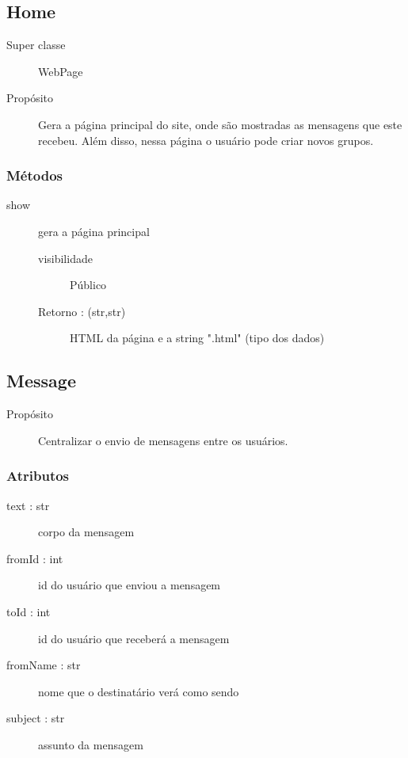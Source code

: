 \documentclass[a4paper]{article}
\begin{document}
	\subsection{Home}
	
	\begin{description}
		\item [Super classe] WebPage
		\item [Propósito] Gera a página principal do site, onde são mostradas as mensagens que este recebeu. Além disso, nessa página o usuário pode criar novos grupos.
	\end{description}
	
	\subsubsection{Métodos}
		\begin{description} %
		 \item [show] gera a página principal
			\begin{description} %
				\item [visibilidade] Público			 
				\item [Retorno : (str,str)] HTML da página e a string ".html" (tipo dos dados)
			\end{description} %
		\end{description} %
	
	\subsection{Message}
	
	\begin{description}
		\item [Propósito] Centralizar o envio de mensagens entre os usuários.
	\end{description}	
	
	\subsubsection{Atributos}
		\begin{description}
		 \item [text : str] corpo da mensagem
		 \item [fromId : int] id do usuário que enviou a mensagem
		 \item [toId : int] id do usuário que receberá a mensagem
		 \item [fromName : str] nome que o destinatário verá como sendo 
		 \item [subject : str] assunto da mensagem
		\end{description}	
	
\end{document}

